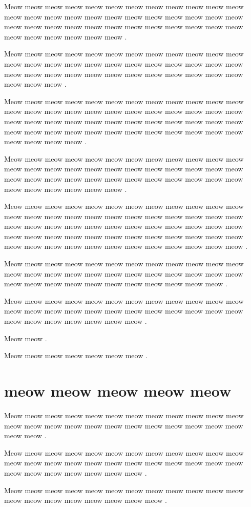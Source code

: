 \documentclass[12pt, a5paper, openany]{book}
\begin{document}
Meow meow meow meow meow meow meow meow meow meow meow meow meow meow meow meow meow meow meow meow meow meow meow meow meow meow meow meow meow meow meow meow meow meow meow meow meow meow meow meow meow meow .

Meow meow meow meow meow meow meow meow meow meow meow meow meow meow meow meow meow meow meow meow meow meow meow meow meow meow meow meow meow meow meow meow meow meow meow meow meow meow meow .

Meow meow meow meow meow meow meow meow meow meow meow meow meow meow meow meow meow meow meow meow meow meow meow meow meow meow meow meow meow meow meow meow meow meow meow meow meow meow meow meow meow meow meow meow meow meow meow meow meow meow meow meow .

Meow meow meow meow meow meow meow meow meow meow meow meow meow meow meow meow meow meow meow meow meow meow meow meow meow meow meow meow meow meow meow meow meow meow meow meow meow meow meow meow meow meow .

Meow meow meow meow meow meow meow meow meow meow meow meow meow meow meow meow meow meow meow meow meow meow meow meow meow meow meow meow meow meow meow meow meow meow meow meow meow meow meow meow meow meow meow meow meow meow meow meow meow meow meow meow meow meow meow meow meow meow meow meow .

Meow meow meow meow meow meow meow meow meow meow meow meow meow meow meow meow meow meow meow meow meow meow meow meow meow meow meow meow meow meow meow meow meow meow meow .

Meow meow meow meow meow meow meow meow meow meow meow meow meow meow meow meow meow meow meow meow meow meow meow meow meow meow meow meow meow meow meow .

Meow meow .

Meow meow meow meow meow meow meow .



\chapter{meow meow meow meow meow }Meow meow meow meow meow meow meow meow meow meow meow meow meow meow meow meow meow meow meow meow meow meow meow meow meow meow .

Meow meow meow meow meow meow meow meow meow meow meow meow meow meow meow meow meow meow meow meow meow meow meow meow meow meow meow meow meow meow meow .

Meow meow meow meow meow meow meow meow meow meow meow meow meow meow meow meow meow meow meow meow .
\end{document}

